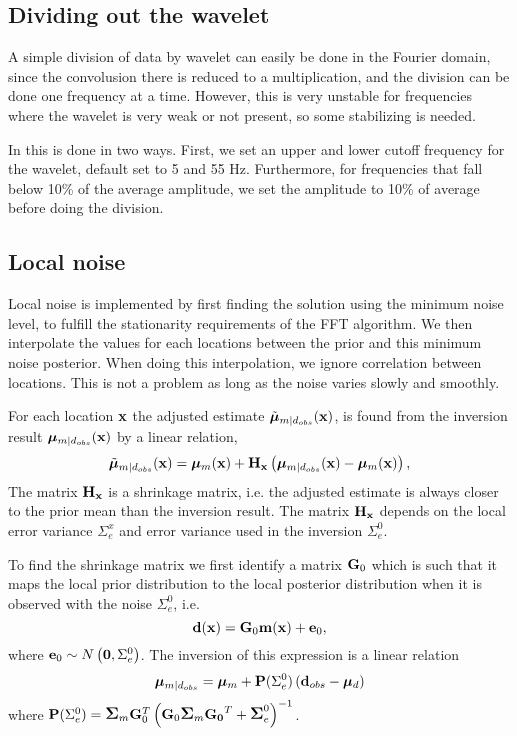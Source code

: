 \subsection{Dividing out the wavelet}
A simple division of data by wavelet can easily be done in the Fourier domain, since the convolusion there is reduced to a multiplication, and the division can be done one frequency at a time. However, this is very unstable for frequencies where the wavelet is very weak or not present, so some stabilizing is needed.

In \crava this is done in two ways. First, we set an upper and lower cutoff frequency for the wavelet, default set to 5 and 55 Hz. Furthermore, for frequencies that fall below 10\% of the average amplitude, we set the amplitude to 10\% of average before doing the division.

\subsection{Local noise}
\label{sec:localnoiseimp}
Local noise is implemented by first finding the solution using the minimum noise level, to fulfill the stationarity requirements of the FFT algorithm. We then interpolate the values for each locations between the prior and this minimum noise posterior. When doing this interpolation, we ignore correlation between locations. This is not a problem as long as the noise varies slowly and smoothly.


For each location $\mathbf{x}$ the adjusted estimate $\tilde{\bm\mu}_{m|d_{obs}}(\mathbf{x})$, is found
from the inversion result $\bm\mu_{m|d_{obs}}(\mathbf{x})$ by a linear relation,
\begin{equation} \label{eq:LocalAdjustment}
\tilde{\bm\mu}_{m|d_{obs}}(\mathbf{x}) = \bm\mu_{m}(\mathbf{x}) +\mathbf{H_x}\left(\bm\mu_{m|d_{obs}}(\mathbf{x})-\bm\mu_{m}(\mathbf{x})\right),
\end{equation}
The matrix $\mathbf{H_x}$ is a shrinkage matrix, i.e. the adjusted estimate
is always closer to the prior mean than the inversion result. The matrix
$\mathbf{H_x}$ depends on the local error variance
 $\Sigma_{e}^x$ and error variance used in the inversion $\Sigma_{e}^0$.

To find the shrinkage matrix we first identify a matrix $\mathbf{G}_0$
which is such that it maps the local prior distribution to the local posterior distribution
when it is observed with the noise $\Sigma_{e}^0$, i.e.
$$ \mathbf{d}(\mathbf{x}) = \mathbf{G}_0\mathbf{m}(\mathbf{x})+\mathbf{e}_0,$$
where $\mathbf{e}_0\sim N\left( \mathbf{0},\Sigma_{e}^0\right)$.
The inversion of this expression is a linear relation
 \begin{equation} \label{eq:PSigmae}
\bm\mu_{m|d_{obs}} =\bm\mu_{m} +\mathbf{P}(\Sigma_{e}^0)\left(\mathbf{d}_{obs}-\bm\mu_{d}\right)
\end{equation}
where  $\mathbf{P}(\Sigma_{e}^0)=\mbox{\large\ensuremath{\boldsymbol{\Sigma}}}_{m}\mathbf{G}_0^T \left( \mathbf{G}_0\mbox{\large\ensuremath{\boldsymbol{\Sigma}}}_{m}\mathbf{G_0}^T+\mbox{\large\ensuremath{\boldsymbol{\Sigma}}}_{e}^0\right)^{-1}$.

